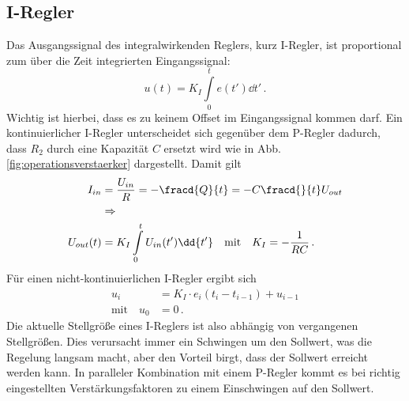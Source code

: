 \subsection{I-Regler}\label{i-regler}
Das Ausgangssignal des integralwirkenden Reglers, kurz I-Regler, ist
proportional zum über die Zeit integrierten Eingangssignal:
\begin{equation}\label{eq:i-regler_01}
	u(t)=K_I\int\limits_0^te(t')\dd{t'}\,.
\end{equation}
Wichtig ist hierbei, dass es zu keinem Offset im Eingangssignal kommen darf. Ein
kontinuierlicher I-Regler unterscheidet sich gegenüber dem P-Regler dadurch, dass $R_2$ durch eine
Kapazität $C$ ersetzt wird wie in Abb.
\ref{fig:operationsverstaerker}
dargestellt. Damit gilt
\begin{equation}\label{eq:i-regler_02}
	\begin{split}
		I_{in}&=\frac{U_{in}}{R}=-\fracd{Q}{t}=-C\fracd{}{t}U_{out}\\
		&\Rightarrow\\
		U_{out}(t)&=K_I\int\limits_0^tU_{in}(t')\dd{t'}
		\quad\text{mit}\quad
		K_I=-\frac{1}{RC}\,.
	\end{split}
\end{equation}
Für einen nicht-kontinuierlichen I-Regler ergibt sich
\begin{equation}\label{eq:i-regler_03}
	\begin{split}
		u_i&=K_I\cdot e_i(t_i-t_{i-1})+u_{i-1}\\
		\text{mit}\quad
		u_{0}&=0\,.
	\end{split}
\end{equation}
Die aktuelle Stellgröße eines I-Reglers ist also abhängig von vergangenen
Stellgrößen. Dies verursacht immer ein Schwingen um den Sollwert, was die
Regelung langsam macht, aber den Vorteil birgt, dass der Sollwert erreicht
werden kann. In paralleler Kombination mit einem P-Regler kommt es bei richtig
eingestellten Verstärkungsfaktoren zu einem Einschwingen auf den Sollwert.

